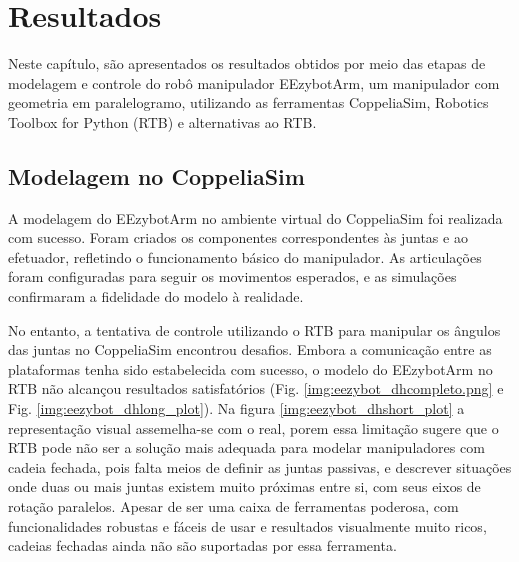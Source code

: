 \chapter{Resultados} \label{ch:RD}

Neste capítulo, são apresentados os resultados obtidos por meio das etapas de modelagem e controle do robô manipulador EEzybotArm, um manipulador com geometria em paralelogramo, utilizando as ferramentas CoppeliaSim, Robotics Toolbox for Python (RTB) e alternativas ao RTB.

\section{Modelagem no CoppeliaSim}
A modelagem do EEzybotArm no ambiente virtual do CoppeliaSim foi realizada com sucesso. Foram criados os componentes correspondentes às juntas e ao efetuador, refletindo o funcionamento básico do manipulador. As articulações foram configuradas para seguir os movimentos esperados, e as simulações confirmaram a fidelidade do modelo à realidade.

 No entanto, a tentativa de controle utilizando o RTB para manipular os ângulos das juntas no CoppeliaSim encontrou desafios. Embora a comunicação entre as plataformas tenha sido estabelecida com sucesso, o modelo do EEzybotArm no RTB não alcançou resultados satisfatórios (Fig. \ref{img:eezybot_dhcompleto.png} e Fig. \ref{img:eezybot_dhlong_plot}). Na figura \ref{img:eezybot_dhshort_plot} a representação visual assemelha-se com o real, porem essa limitação sugere que o RTB pode não ser a solução mais adequada para modelar manipuladores com cadeia fechada, pois falta meios de definir as juntas passivas, e descrever situações onde duas ou mais juntas existem muito próximas entre si, com seus eixos de rotação paralelos. Apesar de ser uma caixa de ferramentas poderosa, com funcionalidades robustas e fáceis de usar e resultados visualmente muito ricos, cadeias fechadas ainda não são suportadas por essa ferramenta. 

